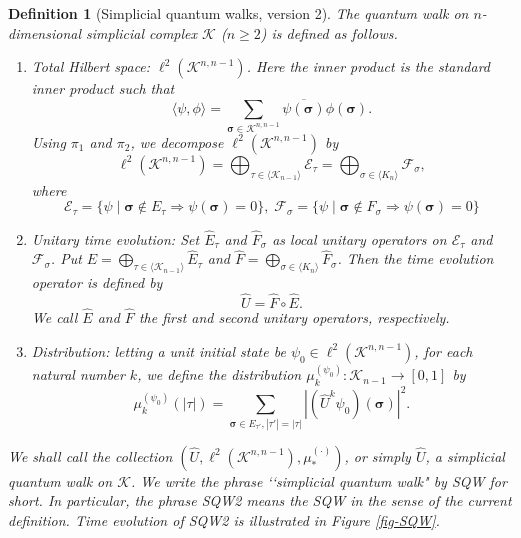 \documentclass[a4paper,12pt]{article}
\newtheorem{definition}{Definition}[section]
\newcommand{\bs}[1]{\boldsymbol{#1}}
\newcommand{\bra}{\langle}
\newcommand{\ket}{\rangle}
\numberwithin{equation}{section}
\begin{document}
\begin{definition}[Simplicial quantum walks, version 2]\rm
\label{dfn-SQW2}
The quantum walk on $n$-dimensional simplicial complex $\mathcal{K}$ ($n\geq 2$) is defined as follows. 
\begin{enumerate}
\item Total Hilbert space: $\ell^2(\mathcal{K}^{n,n-1})$. Here the inner product is the standard inner product such that
	\[ \langle \psi,\phi \rangle=\sum_{ \bs{\sigma} \in \mathcal{K}^{n,n-1}} \overline{\psi(\bs{\sigma})}{\phi(\bs{\sigma})}. \]
Using $\pi_1$ and $\pi_2$, we decompose $\ell^2(\mathcal{K}^{n,n-1})$ by 
\begin{equation*}
\ell^2(\mathcal{K}^{n,n-1})=\bigoplus_{\tau\in\bra \mathcal{K}_{n-1} \ket} \mathcal{E}_{\tau}=\bigoplus_{\sigma\in\bra K_{n} \ket} \mathcal{F}_{\sigma},
\end{equation*}
where
	\[ \mathcal{E}_\tau=\{\psi \;|\; \bs{\sigma}\notin E_\tau \Rightarrow \psi(\bs{\sigma})=0\},\;
           \mathcal{F}_\sigma=\{\psi \;|\; \bs{\sigma}\notin F_\sigma \Rightarrow \psi(\bs{\sigma})=0\}\]
\item Unitary time evolution: Set $\hat{E}_\tau$ and $\hat{F}_\sigma$ as local unitary operators on $\mathcal{E}_\tau$ and $\mathcal{F}_\sigma$. 
Put $\hat{E}=\bigoplus_{\tau\in \bra \mathcal{K}_{n-1} \ket}\hat{E}_\tau$ and $\hat{F}=\bigoplus_{\sigma\in \bra K_{n} \ket}\hat{F}_\sigma$. 
Then the time evolution operator is defined by 
	\[ \hat{U}=\hat{F}\circ \hat{E}. \]
We call $\hat{E}$ and $\hat{F}$ {\em the first and second unitary operators}, respectively. 
\item Distribution: letting  a unit initial state be $\psi_0\in \ell^2(\mathcal{K}^{n,n-1})$, for each natural number $k$, we define the distribution 
$\mu_k^{(\psi_0)}:  \mathcal{K}_{n-1} \to [0,1]$ by 
	\[ \mu_k^{(\psi_0)}(|\tau|)=\sum_{\bs{\sigma}\in E_{\tau'}, |\tau'| = |\tau|}|(\hat U^k\psi_0)(\bs{\sigma})|^2. \]
\end{enumerate}
We shall call the collection $(\hat U, \ell^2(\mathcal{K}^{n,n-1}), \mu_\ast^{(\cdot)})$, or simply $\hat U$, a {\em simplicial quantum walk} on $\mathcal{K}$.
We write the phrase \lq\lq simplicial quantum walk" by {\em SQW} for short.
In particular, the phrase {\em SQW2} means the SQW in the sense of the current definition.
Time evolution of SQW2 is illustrated in Figure \ref{fig-SQW}.
\end{definition}
\end{document}
